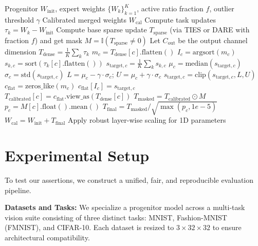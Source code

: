 \documentclass{article}
\theoremstyle{plain}
\theoremstyle{definition}
\theoremstyle{remark}
\begin{document}
\begin{algorithm}[tb]
\caption{QR-SP-WCPR}
\label{alg:qr_sp_wcpr}
\begin{algorithmic}[1]
 Progenitor $W_{\text{init}}$, expert weights $\{W_k\}_{k=1}^K$, active ratio fraction $f$, outlier threshold $\gamma$
 Calibrated merged weights $W_{\text{cal}}$
\STATE Compute task updates $\tau_k = W_k - W_{\text{init}}$
\STATE Compute base sparse update $T_{\text{sparse}}$ (via TIES or DARE with fraction $f$) and get mask $M = \mathbb{I}(T_{\text{sparse}} \neq 0)$
\STATE Let $C_{\text{out}}$ be the output channel dimension
\STATE $T_{\text{dense}} = \frac{1}{K} \sum_k \tau_k$
\STATE $m_{c} = T_{\text{dense}}[c].\text{flatten}()$
\STATE $I_{c} = \text{argsort}(m_{c})$
\STATE $s_{k,c} = \text{sort}(\tau_k[c].\text{flatten}())$
\ENDFOR
\STATE $s_{\text{target},c} = \frac{1}{K}\sum_k s_{k,c}$
\STATE $\mu_c = \text{median}(s_{\text{target},c})$
\STATE $\sigma_c = \text{std}(s_{\text{target},c})$
\STATE $L = \mu_c - \gamma \cdot \sigma_c$; $U = \mu_c + \gamma \cdot \sigma_c$
\STATE $s_{\text{target},c} = \text{clip}(s_{\text{target},c}, L, U)$
\STATE $c_{\text{flat}} = \text{zeros\_like}(m_c)$
\STATE $c_{\text{flat}}[I_c] = s_{\text{target},c}$
\STATE $T_{\text{calibrated}}[c] = c_{\text{flat}}.\text{view\_as}(T_{\text{dense}}[c])$
\ENDFOR
\STATE $T_{\text{masked}} = T_{\text{calibrated}} \odot M$
\STATE $p_c = M[c].\text{float}().\text{mean}()$
\STATE $T_{\text{final}} = T_{\text{masked}} / \sqrt{\max(p_c, 1e-5)}$
\STATE $W_{\text{cal}} = W_{\text{init}} + T_{\text{final}}$
\ELSE
\STATE Apply robust layer-wise scaling for 1D parameters
\ENDIF
\ENDFOR
\end{algorithmic}
\end{algorithm}

\section{Experimental Setup}
To test our assertions, we construct a unified, fair, and reproducible evaluation pipeline.

\textbf{Datasets and Tasks:} We specialize a progenitor model across a multi-task vision suite consisting of three distinct tasks: MNIST, Fashion-MNIST (FMNIST), and CIFAR-10. Each dataset is resized to $3 \times 32 \times 32$ to ensure architectural compatibility.
\end{document}
